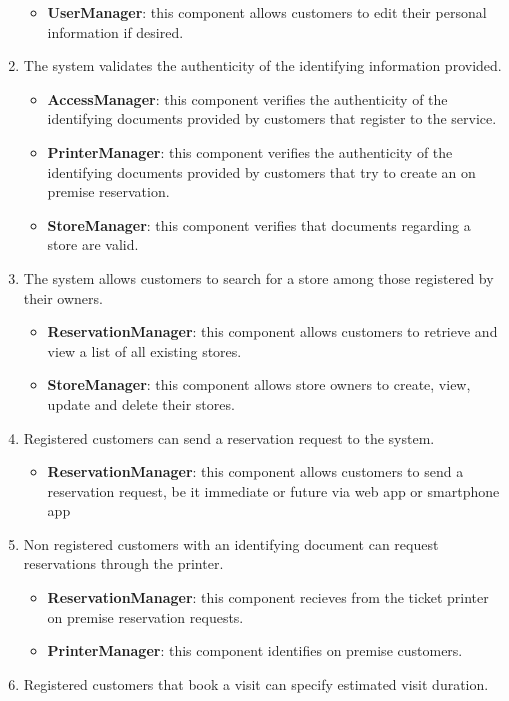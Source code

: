\begin{enumerate}[label=R\arabic*]
\begin{itemize}
		\item \textbf{UserManager}: this component allows customers to edit their personal information if desired.
	\end{itemize}
	\item The system validates the authenticity of the identifying information provided.
	\begin{itemize}
		\item \textbf{AccessManager}: this component verifies the authenticity of the identifying documents provided by customers that register to the service.
		\item \textbf{PrinterManager}: this component verifies the authenticity of the identifying documents provided by customers that try to create an on premise reservation.
		\item \textbf{StoreManager}: this component verifies that documents regarding a store are valid.
	\end{itemize}
	\item The system allows customers to search for a store among those registered by their owners.
	\begin{itemize}
		\item \textbf{ReservationManager}: this component allows customers to retrieve and view a list of all existing stores.
		\item \textbf{StoreManager}: this component allows store owners to create, view, update and delete their stores.
	\end{itemize}
	\item Registered customers can send a reservation request to the system.
	\begin{itemize}
		\item \textbf{ReservationManager}: this component allows customers to send a reservation request, be it immediate or future via web app or smartphone app
	\end{itemize}
	\item Non registered customers with an identifying document can request reservations through the printer.
	\begin{itemize}
		\item \textbf{ReservationManager}: this component recieves from the ticket printer on premise reservation requests.
		\item \textbf{PrinterManager}: this component identifies on premise customers.
	\end{itemize}
	\item Registered customers that book a visit can specify estimated visit duration.

\end{enumerate}
